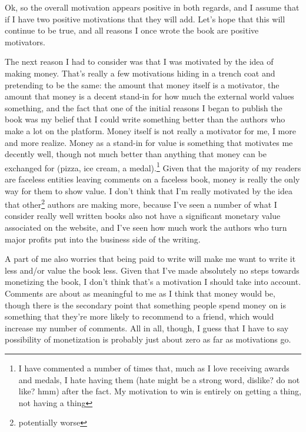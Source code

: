 \documentclass[12pt]{article}[titlepage]
\renewcommand{\,}{\textsuperscript{,}}
\begin{document}
Ok, so the overall motivation appears positive in both regards, and I assume that if I have two positive motivations that they will add.  
Let's hope that this will continue to be true, and all reasons I once wrote the book are positive motivators.

The next reason I had to consider was that I was motivated by the idea of making money.  
That's really a few motivations hiding in a trench coat and pretending to be the same: the amount that money itself is a motivator, the amount that money is a decent stand-in for how much the external world values something, and the fact that one of the initial reasons I began to publish the book was my belief that I could write something better than the authors who make a lot on the platform.  
Money itself is not really a motivator for me, I more and more realize.  
Money as a stand-in for value is something that motivates me decently well, though not much better than anything that money can be exchanged for (pizza, ice cream, a medal).\footnote{I have commented a number of times that, much as I love receiving awards and medals, I hate having them (hate might be a strong word, dislike? do not like? hmm) after the fact. My motivation to win is entirely on getting a thing, not having a thing}  
Given that the majority of my readers are faceless entities leaving comments on a faceless book, money is really the only way for them to show value.  
I don't think that I'm really motivated by the idea that other\footnote{potentially worse} authors are making more, because I've seen a number of what I consider really well written books also not have a significant monetary value associated on the website, and I've seen how much work the authors who turn major profits put into the business side of the writing.

A part of me also worries that being paid to write will make me want to write it less and/or value the book less.  
Given that I've made absolutely no steps towards monetizing the book, I don't think that's a motivation I should take into account.  
Comments are about as meaningful to me as I think that money would be, though there is the secondary point that something people spend money on is something that they're more likely to recommend to a friend, which would increase my number of comments.  
All in all, though, I guess that I have to say possibility of monetization is probably just about zero as far as motivations go.
\end{document}
